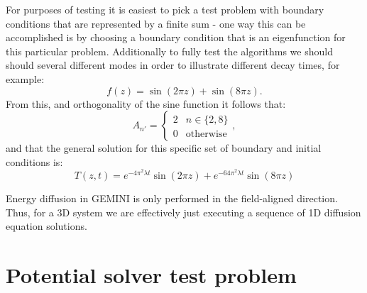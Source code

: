 \documentclass[11pt,letterpaper]{article}
\begin{document}
For purposes of testing it is easiest to pick a test problem with boundary conditions that are represented by a finite sum - one way this can be accomplished is by choosing a boundary condition that is an eigenfunction for this particular problem.  Additionally to fully test the algorithms we should should several different modes in order to illustrate different decay times, for example:  
\begin{equation}
 f(z) = \sin(2 \pi z) + \sin(8 \pi z).
\end{equation}
From this, and orthogonality of the sine function it follows that:
\begin{equation}
A_{n'} = \left\{ \begin{array}{cc} 2 & n \in \{2,8\} \\ 0 & \mathrm{otherwise}  \end{array} \right. ,
\end{equation}
and that the general solution for this specific set of boundary and initial conditions is:  
\begin{equation}
T(z,t) = e^{-4 \pi^2 \lambda t} \sin \left( 2 \pi z \right)+e^{-64 \pi^2 \lambda t} \sin \left( 8 \pi z \right)
\end{equation}

Energy diffusion in GEMINI is only performed in the field-aligned direction.  Thus, for a 3D system we are effectively just executing a sequence of 1D diffusion equation solutions.  


\section{Potential solver test problem}
\end{document}
